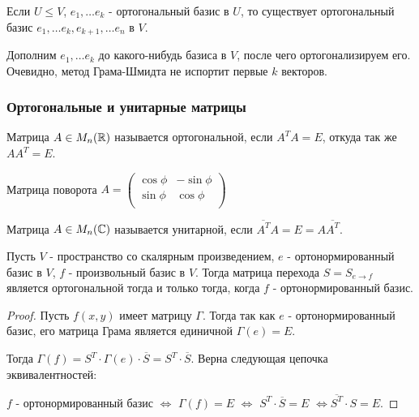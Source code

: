 \begin{corollary}
    Если $U \leq V$, $e_1, \dots e_k$  - ортогональный базис в $U$, то существует ортогональный 
    базис $e_1, \dots e_k, e_{k+1}, \dots e_n$ в $V$.
\end{corollary}

\begin{idea}
    Дополним $e_1, \dots e_k$ до какого-нибудь базиса в $V$, после чего ортогонализируем его. Очевидно,
    метод Грама-Шмидта не испортит первые $k$ векторов.
\end{idea}

\subsubsection{Ортогональные и унитарные матрицы}

\begin{definition}
    Матрица $A \in M_n(\mathbb{R})$ называется ортогональной, если $A^T A = E$, откуда так же $A A^T = E$.
\end{definition}

\begin{example}
    Матрица поворота $A = \begin{pmatrix}
    \cos \phi & - \sin \phi    \\
    \sin \phi &   \cos \phi    \\
    \end{pmatrix}$
\end{example}

\begin{definition}
    Матрица $A \in M_n(\mathbb{C})$ называется унитарной, если $\overline{A^T} A = E = A \overline{A^T}$.
\end{definition}
 
\begin{proposition}
    Пусть $V$ - пространство со скалярным произведением, $e$ - ортонормированный базис в $V$, 
    $f$ - произвольный базис в $V$. Тогда матрица перехода $S = S_{e \to f}$ является 
    ортогональной тогда и только тогда, когда $f$ - ортонормированный базис.
\end{proposition}

\begin{proof}
    Пусть $f(x, y)$ имеет матрицу $\Gamma$. Тогда так как $e$ - ортонормированный базис, его 
    матрица Грама является единичной $\Gamma(e) = E$.

    Тогда $\Gamma(f) = S^T \cdot \Gamma(e) \cdot \overline{S} = S^T \cdot \overline{S}$. Верна следующая цепочка эквивалентностей:

    $f$ - ортонормированный базис $\Leftrightarrow$ $\Gamma(f) = E$ $\Leftrightarrow$ $S^T \cdot \overline{S} = E$ 
    $\Leftrightarrow \overline{S^T} \cdot S = E$.
\end{proof}

